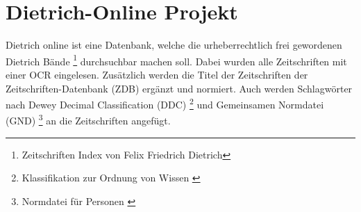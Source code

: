 \chapter{Dietrich-Online Projekt}
\label{dietrichonline}

Dietrich online ist eine Datenbank, welche die urheberrechtlich frei gewordenen Dietrich Bände \footnote{Zeitschriften Index von Felix Friedrich Dietrich} durchsuchbar machen soll. Dabei wurden alle Zeitschriften mit einer OCR eingelesen. Zusätzlich werden die Titel der Zeitschriften der Zeitschriften-Datenbank (ZDB) ergänzt und normiert. Auch werden Schlagwörter nach Dewey Decimal Classification (DDC)  \footnote{Klassifikation zur Ordnung von Wissen \cite{DeutscheNationalBibliothek.ddc}} und Gemeinsamen Normdatei (GND)  \footnote{Normdatei für Personen \cite{DeutscheNationalBibliothek.2019b}} an die Zeitschriften angefügt. \cite{UniversityofTrier.2016}